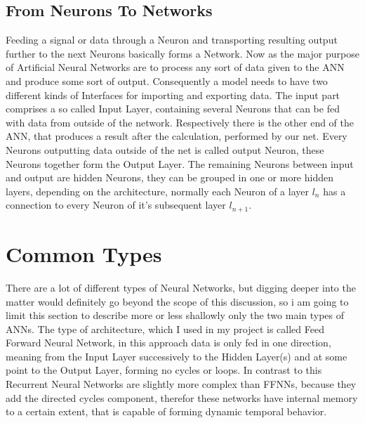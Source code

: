 \subsection{From Neurons To Networks}
Feeding a signal or data through a Neuron and transporting resulting output further to the next Neurons basically forms a Network. Now as the major purpose of Artificial Neural Networks are to process any sort of data given to the ANN and produce some sort of output. Consequently a model needs to have two different kinds of Interfaces for importing and exporting data. \newline
The input part comprises a so called Input Layer, containing several Neurons that can be fed with data from outside of the network. Respectively there is the other end of the ANN, that produces a result after the calculation, performed by our net. Every Neurons outputting data outside of the net is called output Neuron, these Neurons together form the Output Layer. The remaining Neurons between input and output are hidden Neurons, they can be grouped in one or more hidden layers, depending on the architecture, normally each Neuron of a layer $l_{n}$ has a connection to every Neuron of it's subsequent layer $l_{n+1}$.

\section{Common Types}
There are a lot of different types of Neural Networks, but digging deeper into the matter would definitely go beyond the scope of this discussion, so i am going to limit this section to describe more or less shallowly only the two main types of ANNs.\newline
The type of architecture, which I used in my project is called Feed Forward Neural Network, in this approach data is only fed in one direction, meaning from the Input Layer successively to the Hidden Layer(s) and at some point to the Output Layer, forming no cycles or loops. \newline
In contrast to this Recurrent Neural Networks are slightly more complex than FFNNs, because they add the directed cycles component, therefor these networks have internal memory to a certain extent, that is capable of forming dynamic temporal behavior.


